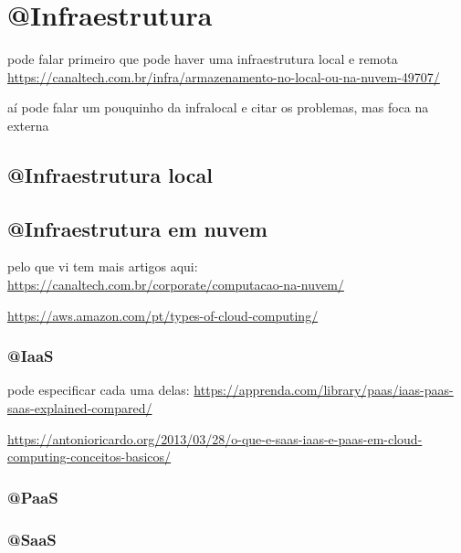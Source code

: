 \chapter{@Infraestrutura}

pode falar primeiro que pode haver uma infraestrutura local e remota
\url{https://canaltech.com.br/infra/armazenamento-no-local-ou-na-nuvem-49707/}

aí pode falar um pouquinho da infralocal e citar os problemas,
mas foca na externa

\section{@Infraestrutura local}

\section{@Infraestrutura em nuvem}

pelo que vi tem mais artigos aqui: \url{https://canaltech.com.br/corporate/computacao-na-nuvem/}

\url{https://aws.amazon.com/pt/types-of-cloud-computing/}

\subsection{@IaaS}

pode especificar cada uma delas:
\url{https://apprenda.com/library/paas/iaas-paas-saas-explained-compared/}

\url{https://antonioricardo.org/2013/03/28/o-que-e-saas-iaas-e-paas-em-cloud-computing-conceitos-basicos/}

\subsection{@PaaS}

\subsection{@SaaS}
